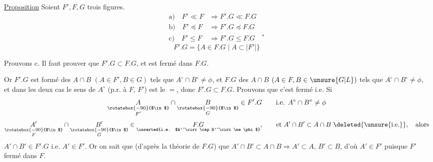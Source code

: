 \uline{Proposition} Soient $F',F,G$ trois figures.
\[
\begin{aligned}
 \text{a)}\quad F'\ll F&\Longrightarrow F'.G\ll F.G\\
 \text{b)}\quad F'\preceq F&\Longrightarrow F'.G\preceq F.G\\
 \text{c)}\quad F'\leq F&\Longrightarrow F'.G\leq F.G\quad{}^{*}
\end{aligned}
\]
\[
 F'.G=\{A\in F.G\mid A\subset |F'|\}
\]

Prouvons c. Il faut prouver que  $F'.G\subset F.G$, et est fermé dans $F.G$.

 Or $F'.G$ est formé des $A\cap B$ $(A\in F',B\in G)$ tels que $A^\circ\cap B^\circ\ne\phi$, et $F.G$ des $A\cap B$ $(A\in F,B\in \unsure{G|L})$ tels que $A^\circ\cap B^\circ\ne\phi$, et dans les deux cas le sens de $A^\circ$ (p.r. à $F$,  $F'$) est le $=$, donc $F'.G\subset F.G$. Prouvons que c'est fermé i.e.
Si 
\[
 \underset{\substack{\rotatebox{-90}{$\in$}\\ F'}}{A}\cap
 \underset{\substack{\rotatebox{-90}{$\in$}\\ G}}{B}\in F'.G\qquad
 \text{i.e. } A^\circ\cap B^\circ\ne\phi
\]
\[
 \underset{\substack{\rotatebox{-90}{$\in$}\\ F}}{A'}\cap
 \underset{\substack{\rotatebox{-90}{$\in$}\\ G}}{B'}\in\underset{\text{\inserted{i.e. $A'^\circ\cap B'^\circ\ne\phi$}}}{F.G},\qquad
 \text{et } A'\cap B'\subset A\cap B\ \deleted{\unsure{\text{i.e.}}},\quad\text{alors}
\]
$A'\cap B'\in F'.G$ i.e. $A'\in F'$. Or on sait que (d'après la théorie de $F.G$) que $A'\cap B'\subset A\cap B\Longrightarrow A'\subset A$, $B'\subset B$, d'où $A'\in F'$ puisque $F'$ fermé dans $F$.

